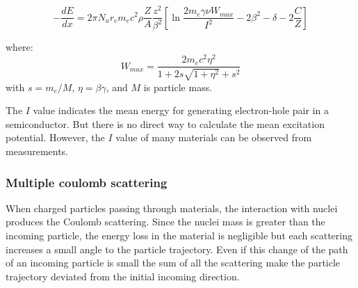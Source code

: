 \documentclass[12pt,a4paper]{article}
\begin{document}
\begin{equation}
    \label{eq:Bethe-Bloch}
    -\frac{dE}{dx} = 2\pi N_a r_e m_e c^2 \rho \frac{Z}{A} \frac{z^2}{\beta^2} \left[\ln{\frac{2m_e\gamma \nu W_{max}}{I^2}} - 2\beta^2 - \delta - 2\frac{C}{Z}\right]
\end{equation}

\begin{center}
\begin{table}[ht]
\end{table}    
\end{center}
where:
\begin{equation}
    \label{eq:Wmax}
    W_{max} = \frac{2m_ec^2\eta^2}{1 + 2s\sqrt{1 + \eta^2} + s^2}
\end{equation}
\noindent with $s = m_e/M$, $\eta = \beta \gamma$, and $M$ is particle mass.

The $I$ value indicates the mean energy for generating electron-hole pair in a semiconductor.  But there is no direct way to calculate the mean excitation potential.  However, the $I$ value of many materials can be observed from measurements.

\subsubsection{Multiple coulomb scattering}
When charged particles passing through materials, the interaction with nuclei produces the Coulomb scattering.  Since the nuclei  mass is greater than the incoming particle, the energy loss in the material is negligible but each scattering increases a small angle to the particle trajectory. Even if this change of the path of an incoming particle is small the sum of all the scattering make the particle trajectory  deviated from the initial incoming direction. 
\end{document}
